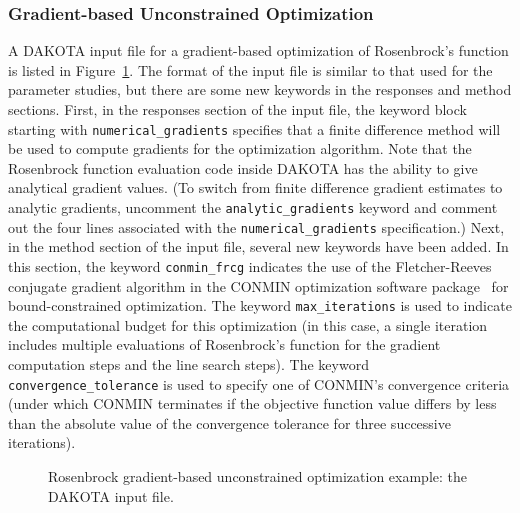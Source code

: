 \subsubsection{Gradient-based Unconstrained Optimization}\label{tutorial:example:optimization:gradient1}

A DAKOTA input file for a gradient-based optimization of Rosenbrock's
function is listed in Figure~\ref{tutorial:rosenbrock_grad}. The
format of the input file is similar to that used for the parameter
studies, but there are some new keywords in the responses and method
sections.  First, in the responses section of the input file, the
keyword block starting with \texttt{numerical\_gradients} specifies
that a finite difference method will be used to compute gradients for
the optimization algorithm. Note that the Rosenbrock function
evaluation code inside DAKOTA has the ability to give analytical
gradient values.  (To switch from finite difference gradient estimates
to analytic gradients, uncomment the \texttt{analytic\_gradients}
keyword and comment out the four lines associated with the
\texttt{numerical\_gradients} specification.)
Next, in the method
section of the input file, several new keywords have been added. In
this section, the keyword \texttt{conmin\_frcg} indicates the use of
the Fletcher-Reeves conjugate gradient algorithm in the CONMIN
optimization software package~\cite{Van78} for bound-constrained
optimization.  The keyword \texttt{max\_iterations} is used to
indicate the computational budget for this optimization (in this case,
a single iteration includes multiple evaluations of Rosenbrock's
function for the gradient computation steps and the line search
steps). The keyword \texttt{convergence\_tolerance} is used to specify
one of CONMIN's convergence criteria (under which CONMIN terminates if the
objective function value differs by less than the absolute value of
the convergence tolerance for three successive iterations).

\begin{figure}
  \centering
  \begin{bigbox}
    \begin{small}
    \end{small}
  \end{bigbox}
  \caption{Rosenbrock gradient-based unconstrained optimization
  example: the DAKOTA input file.}
  \label{tutorial:rosenbrock_grad}
\end{figure}

